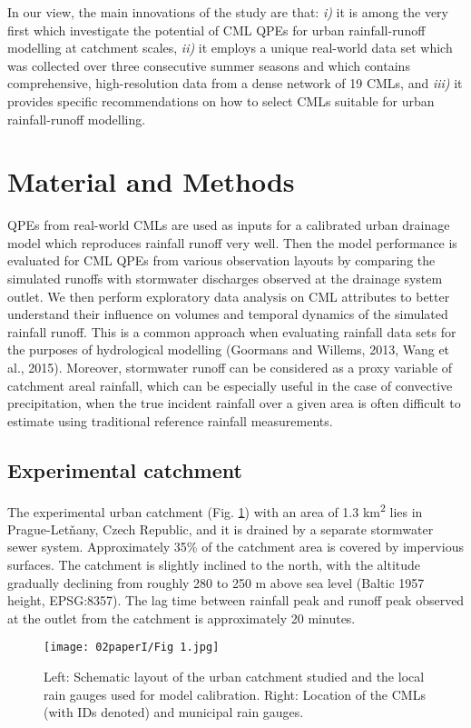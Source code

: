 \documentclass{ctuthesis}\usepackage[]{graphicx}\usepackage[]{color}
\begin{document}
In our view, the main innovations of the study are that: \emph{i)} it is among the very first which investigate the potential of CML QPEs for urban rainfall-runoff modelling at catchment scales, \emph{ii)} it employs a unique real-world data set which was collected over three consecutive summer seasons and which contains comprehensive, high-resolution data from a dense network of 19 CMLs, and \emph{iii)} it provides specific recommendations on how to select CMLs suitable for urban rainfall-runoff modelling.

\section{Material and Methods}

QPEs from real-world CMLs are used as inputs for a calibrated urban drainage model which reproduces rainfall runoff very well. Then the model performance is evaluated for CML QPEs from various observation layouts by comparing the simulated runoffs with stormwater discharges observed at the drainage system outlet. We then perform exploratory data analysis on CML attributes to better understand their influence on volumes and temporal dynamics of the simulated rainfall runoff. This is a common approach when evaluating rainfall data sets for the purposes of hydrological modelling (Goormans and Willems, 2013, Wang et al., 2015). Moreover, stormwater runoff can be considered as a proxy variable of catchment areal rainfall, which can be especially useful in the case of convective precipitation, when the true incident rainfall over a given area is often difficult to estimate using traditional reference rainfall measurements.

\subsection{Experimental catchment}

The experimental urban catchment (Fig. \ref{2fig1}) with an area of 1.3 km\textsuperscript{2} lies in Prague-Letňany, Czech Republic, and it is drained by a separate stormwater sewer system. Approximately 35\% of the catchment area is covered by impervious surfaces. The catchment is slightly inclined to the north, with the altitude gradually declining from roughly 280 to 250 m above sea level (Baltic 1957 height, EPSG:8357). The lag time between rainfall peak and runoff peak observed at the outlet from the catchment is approximately 20 minutes.


\begin{figure}[p]
\begin{center}
\texttt{[image: 02paperI/Fig 1.jpg]}
\caption{Left: Schematic layout of the urban catchment studied and the local rain gauges used for model calibration. Right: Location of the CMLs (with IDs denoted) and municipal rain gauges.} \label{2fig1}
\end{center}
\end{figure}
\end{document}
